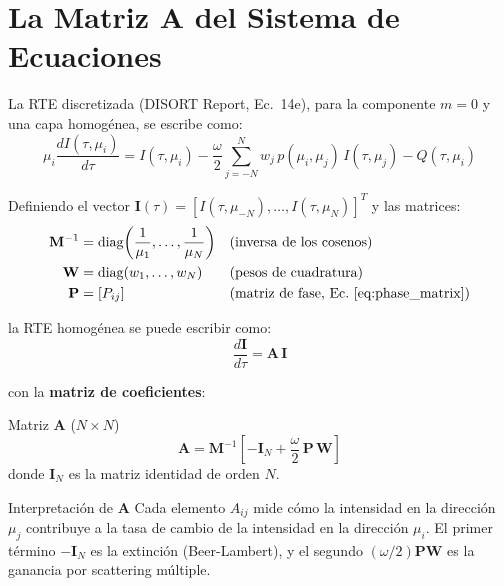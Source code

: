 \documentclass[a4paper,11pt]{article}
\begin{document}
\section{La Matriz $\mathbf{A}$ del Sistema de Ecuaciones}
\label{sec:A_matrix}

La RTE discretizada (DISORT Report, Ec.\ 14e), para la componente $m=0$ y una capa homog\'enea, se escribe como:
\begin{equation}
\mu_i \frac{dI(\tau, \mu_i)}{d\tau} = I(\tau, \mu_i) - \frac{\omega}{2} \sum_{j=-N}^{N} w_j \, p(\mu_i, \mu_j) \, I(\tau, \mu_j) - Q(\tau, \mu_i)
\end{equation}

Definiendo el vector $\mathbf{I}(\tau) = [I(\tau, \mu_{-N}), \ldots, I(\tau, \mu_{N})]^T$ y las matrices:
\begin{align}
\mathbf{M}^{-1} &= \text{diag}\!\left(\frac{1}{\mu_1}, \ldots, \frac{1}{\mu_N}\right) & &\text{(inversa de los cosenos)} \\
\mathbf{W} &= \text{diag}(w_1, \ldots, w_N) & &\text{(pesos de cuadratura)} \\
\mathbf{P} &= [P_{ij}] & &\text{(matriz de fase, Ec.~\ref{eq:phase_matrix})}
\end{align}

la RTE homog\'enea se puede escribir como:
\begin{equation}
\frac{d\mathbf{I}}{d\tau} = \mathbf{A} \, \mathbf{I}
\end{equation}

con la \textbf{matriz de coeficientes}:

\begin{keyresult}{Matriz $\mathbf{A}$ ($N \times N$)}
\begin{equation}
\boxed{\mathbf{A} = \mathbf{M}^{-1} \left[ -\mathbf{I}_N + \frac{\omega}{2} \, \mathbf{P} \, \mathbf{W} \right]}
\label{eq:A_matrix}
\end{equation}
donde $\mathbf{I}_N$ es la matriz identidad de orden $N$.
\end{keyresult}

\begin{physics}{Interpretaci\'on de $\mathbf{A}$}
Cada elemento $A_{ij}$ mide c\'omo la intensidad en la direcci\'on $\mu_j$ contribuye a la tasa de cambio de la intensidad en la direcci\'on $\mu_i$. El primer t\'ermino $-\mathbf{I}_N$ es la extinci\'on (Beer-Lambert), y el segundo $(\omega/2)\mathbf{P}\mathbf{W}$ es la ganancia por scattering m\'ultiple.
\end{physics}
\end{document}
